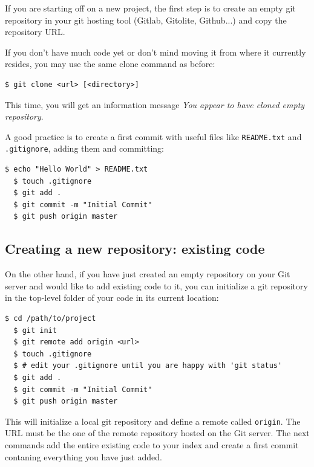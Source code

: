 \documentclass{../../common/tufte-latex/tufte-handout}
\begin{document}
If you are starting off on a new project, the first step is to create an empty git repository in your git hosting tool (Gitlab, Gitolite, Github...) and copy the repository URL.

If you don't have much code yet or don't mind moving it from where it currently resides, you may use the same clone command as before:

\begin{lstlisting}[style=BashInputStyle]
  $ git clone <url> [<directory>]
\end{lstlisting}

This time, you will get an information message \textit{You appear to have cloned empty repository}.

A good practice is to create a first commit with useful files like \texttt{README.txt} and \texttt{.gitignore}, adding them and committing: 

\begin{lstlisting}[style=BashInputStyle]
  $ echo "Hello World" > README.txt
  $ touch .gitignore
  $ git add .
  $ git commit -m "Initial Commit"
  $ git push origin master
\end{lstlisting}

\subsection{Creating a new repository: existing code}

On the other hand, if you have just created an empty repository on your Git server and would like to add existing code to it, you can initialize a git repository in the top-level folder of your code in its current location: 

\begin{lstlisting}[style=BashInputStyle]
  $ cd /path/to/project
  $ git init
  $ git remote add origin <url>
  $ touch .gitignore
  $ # edit your .gitignore until you are happy with 'git status'
  $ git add .
  $ git commit -m "Initial Commit"
  $ git push origin master
\end{lstlisting} 

This will initialize a local git repository and define a remote called \texttt{origin}. The URL must be the one of the remote repository hosted on the Git server. The next commands add the entire existing code to your index and create a first commit contaning everything you have just added. 
\end{document}
